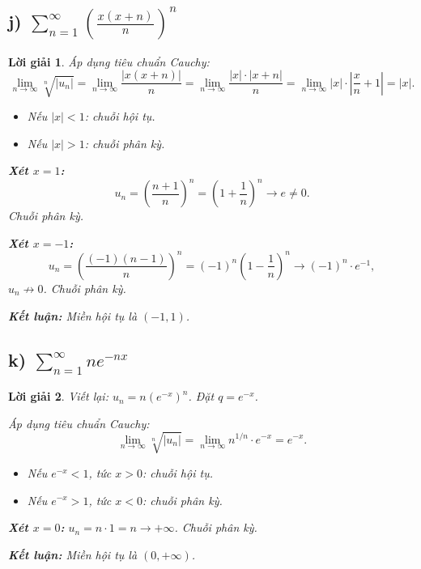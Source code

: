 \documentclass[12pt,a4paper]{article}
\newtheorem*{solution}{Lời giải}
\begin{document}
\subsection*{j) $\displaystyle\sum_{n=1}^{\infty}\left(\frac{x(x+n)}{n}\right)^{n}$}

\begin{solution}
Áp dụng tiêu chuẩn Cauchy:
\[
\lim_{n\to\infty}\sqrt[n]{|u_n|} = \lim_{n\to\infty}\frac{|x(x+n)|}{n} = \lim_{n\to\infty}\frac{|x| \cdot |x+n|}{n} = \lim_{n\to\infty}|x|\cdot\left|\frac{x}{n}+1\right| = |x|.
\]

\begin{itemize}
    \item Nếu $|x| < 1$: chuỗi hội tụ.
    \item Nếu $|x| > 1$: chuỗi phân kỳ.
\end{itemize}

\textbf{Xét $x = 1$:}
\[
u_n = \left(\frac{n+1}{n}\right)^n = \left(1+\frac{1}{n}\right)^n \to e \neq 0.
\]
Chuỗi phân kỳ.

\textbf{Xét $x = -1$:}
\[
u_n = \left(\frac{(-1)(n-1)}{n}\right)^n = (-1)^n\left(1 - \frac{1}{n}\right)^n \to (-1)^n \cdot e^{-1},
\]
$u_n \not\to 0$. Chuỗi phân kỳ.

\textbf{Kết luận:} Miền hội tụ là $\boxed{(-1, 1)}$.
\end{solution}

\subsection*{k) $\displaystyle\sum_{n=1}^{\infty}ne^{-nx}$}

\begin{solution}
Viết lại: $u_n = n\left(e^{-x}\right)^n$. Đặt $q = e^{-x}$.

Áp dụng tiêu chuẩn Cauchy:
\[
\lim_{n\to\infty}\sqrt[n]{|u_n|} = \lim_{n\to\infty} n^{1/n}\cdot e^{-x} = e^{-x}.
\]

\begin{itemize}
    \item Nếu $e^{-x} < 1$, tức $x > 0$: chuỗi hội tụ.
    \item Nếu $e^{-x} > 1$, tức $x < 0$: chuỗi phân kỳ.
\end{itemize}

\textbf{Xét $x = 0$:} $u_n = n \cdot 1 = n \to +\infty$. Chuỗi phân kỳ.

\textbf{Kết luận:} Miền hội tụ là $\boxed{(0, +\infty)}$.
\end{solution}
\end{document}
